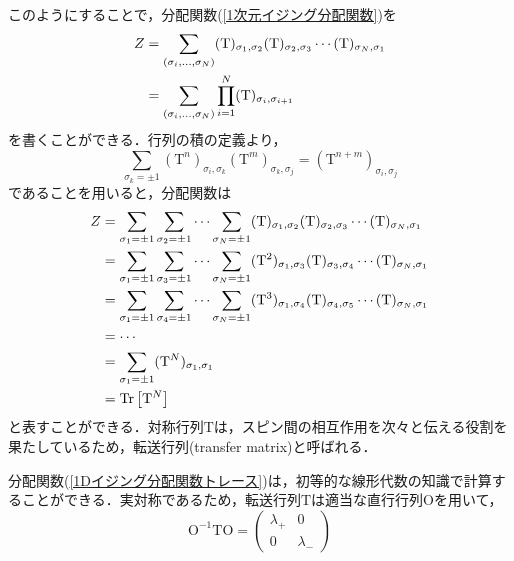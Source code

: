 \documentclass[a4paper,11pt]{jsreport}
\begin{document}
このようにすることで，分配関数(\ref{1次元イジング分配関数})を
\begin{align}
  Z
   & = \sum_{(\sigma_i,\dots,\sigma_N)} (\mathrm{T})_{\sigma_1, \sigma_2} (\mathrm{T})_{\sigma_2, \sigma_3} \cdots (\mathrm{T})_{\sigma_N, \sigma_1} \notag \\
   & = \sum_{(\sigma_i,\dots,\sigma_N)} \prod_{i = 1}^N (\mathrm{T})_{\sigma_i, \sigma_{i+1}}
\end{align}
を書くことができる．行列の積の定義より，
\begin{equation}
  \sum_{\sigma_k = \pm{1}}(\mathrm{T}^n)_{\sigma_i, \sigma_k}(\mathrm{T}^m)_{\sigma_k, \sigma_j}
  = (\mathrm{T}^{n+m})_{\sigma_i, \sigma_j}
\end{equation}
であることを用いると，分配関数は
\begin{align}
  Z
   & = \sum_{\sigma_1 = \pm{1}}\sum_{\sigma_2 = \pm{1}} \cdots \sum_{\sigma_N = \pm{1}} (\mathrm{T})_{\sigma_1, \sigma_2} (\mathrm{T})_{\sigma_2, \sigma_3} \cdots (\mathrm{T})_{\sigma_N, \sigma_1} \notag   \\
   & = \sum_{\sigma_1 = \pm{1}}\sum_{\sigma_3 = \pm{1}} \cdots \sum_{\sigma_N = \pm{1}} (\mathrm{T}^2)_{\sigma_1, \sigma_3} (\mathrm{T})_{\sigma_3, \sigma_4} \cdots (\mathrm{T})_{\sigma_N, \sigma_1} \notag \\
   & = \sum_{\sigma_1 = \pm{1}}\sum_{\sigma_4 = \pm{1}} \cdots \sum_{\sigma_N = \pm{1}} (\mathrm{T}^3)_{\sigma_1, \sigma_4} (\mathrm{T})_{\sigma_4, \sigma_5} \cdots (\mathrm{T})_{\sigma_N, \sigma_1} \notag \\
   & = \cdots \notag                                                                                                                                                                                          \\
   & = \sum_{\sigma_1 = \pm{1}} (\mathrm{T}^N)_{\sigma_1, \sigma_1} \notag                                                                                                                                    \\
   & = \mathrm{Tr}\left[ \mathrm{T}^N \right] \label{1Dイジング分配関数トレース}
\end{align}
と表すことができる．対称行列$\mathrm{T}$は，スピン間の相互作用を次々と伝える役割を果たしているため，転送行列(transfer matrix)と呼ばれる．\par
分配関数(\ref{1Dイジング分配関数トレース})は，初等的な線形代数の知識で計算することができる．実対称であるため，転送行列$\mathrm{T}$は適当な直行行列$\mathrm{O}$を用いて，
\begin{equation}
  \mathrm{O}^{-1} \mathrm{T} \mathrm{O} =
  \begin{pmatrix}
    \lambda_{+} & 0           \\
    0           & \lambda_{-}
  \end{pmatrix}
\end{equation}
\end{document}
